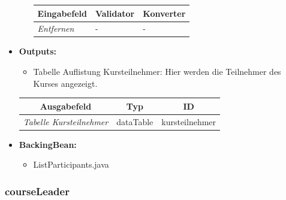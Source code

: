 \begin{itemize}
\begin{itemize}
				\begin{center}
					\begin{longtable}{|p{3cm} |p{8cm} | p{5cm}|}
						
						\hline \multicolumn{1}{|c|}{\textbf{Eingabefeld}} & \multicolumn{1}{|c|}{\textbf{Validator}} & \multicolumn{1}{|c|}{\textbf{Konverter}} \\ \hline
						\endfirsthead
						\hline
						\endlastfoot
						\textit{Entfernen} & - & - \\ \hline
					\end{longtable}
				\end{center}
				
			\end{itemize}
			\item \textbf{Outputs:} 
			\begin{itemize}
				\item Tabelle Auflistung Kursteilnehmer: Hier werden die Teilnehmer des Kurses angezeigt.
			\end{itemize}
			
			\begin{center}
				\begin{longtable}{|p{5cm} | p{4cm}|p{3cm}|}
					
					\hline \multicolumn{1}{|c|}{\textbf{Ausgabefeld}} & \multicolumn{1}{|c|}{\textbf{Typ}}  &  \multicolumn{1}{|c|}{\textbf{ID}} \\ \hline
					\endfirsthead
					\hline
					\endlastfoot
					\textit{Tabelle Kursteilnehmer}  & dataTable & kursteilnehmer \\ \hline
				\end{longtable}
			\end{center}
			
			
			\item \textbf{BackingBean:}
			\begin{itemize}
				\item ListParticipants.java
			\end{itemize}
		\end{itemize}
		
		\subsubsection{courseLeader}
		
